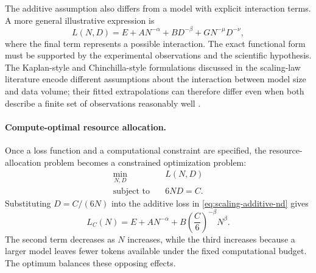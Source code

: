 The additive assumption also differs from a model with explicit interaction
terms. A more general illustrative expression is
\begin{equation}
    L(N,D)
    =
    E+AN^{-\alpha}+BD^{-\beta}
    +GN^{-\mu}D^{-\nu},
    \label{eq:scaling-interaction}
\end{equation}
where the final term represents a possible interaction. The exact functional
form must be supported by the experimental observations and the scientific
hypothesis. The Kaplan-style and Chinchilla-style formulations discussed in
the scaling-law literature encode different assumptions about the interaction
between model size and data volume; their fitted extrapolations can therefore
differ even when both describe a finite set of observations reasonably well
\parencite{Li2025MisFitting,Sengupta2025ScalingSurvey}.

\paragraph{Compute-optimal resource allocation.}
Once a loss function and a computational constraint are specified, the
resource-allocation problem becomes a constrained optimization problem:
\begin{equation}
    \begin{aligned}
        \min_{N,D}\quad & L(N,D)\\
        \text{subject to}\quad & 6ND=C.
    \end{aligned}
    \label{eq:scaling-compute-optimization}
\end{equation}
Substituting \(D=C/(6N)\) into the additive loss in
\cref{eq:scaling-additive-nd} gives
\begin{equation}
    L_C(N)
    =
    E+AN^{-\alpha}
    +B\left(\frac{C}{6}\right)^{-\beta}N^\beta.
    \label{eq:scaling-loss-fixed-compute}
\end{equation}
The second term decreases as \(N\) increases, while the third increases
because a larger model leaves fewer tokens available under the fixed
computational budget. The optimum balances these opposing effects.

